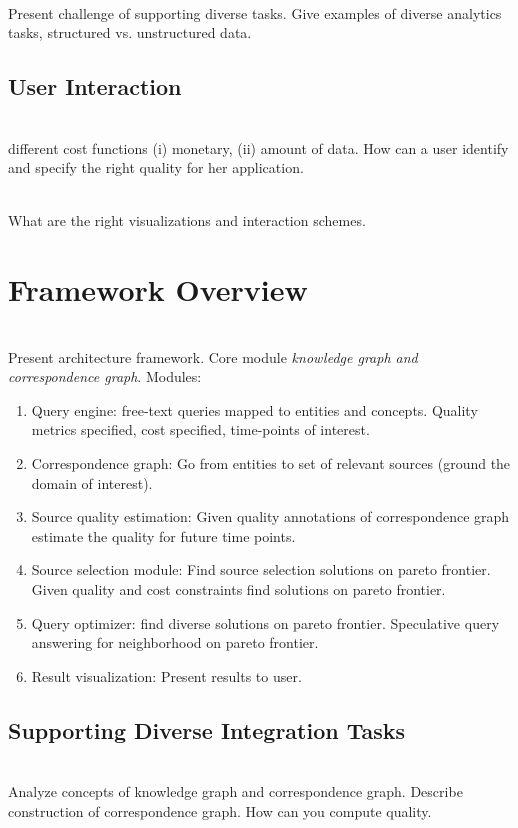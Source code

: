 \documentclass{sig-alternate}
\begin{document}
\ \\Present challenge of supporting diverse tasks. Give examples of diverse analytics tasks, structured vs. unstructured data. 

\subsection{User Interaction}
\ \\different cost functions (i) monetary, (ii) amount of data. How can a user identify and specify the right quality for her application. 

\ \\What are the right visualizations and interaction schemes.

\section{Framework Overview}

\ \\Present architecture framework. Core module {\em knowledge graph and correspondence graph}. Modules:
\begin{enumerate}
\item Query engine: free-text queries mapped to entities and concepts. Quality metrics specified, cost specified, time-points of interest. 
\item Correspondence graph: Go from entities to set of relevant sources (ground the domain of interest). 
\item Source quality estimation: Given quality annotations of correspondence graph estimate the quality for future time points.
\item Source selection module: Find source selection solutions on pareto frontier. Given quality and cost constraints find solutions on pareto frontier. 
\item Query optimizer: find diverse solutions on pareto frontier. Speculative query answering for neighborhood on pareto frontier. 
\item Result visualization: Present results to user. 
\end{enumerate}

\subsection{Supporting Diverse Integration Tasks}

\ \\Analyze concepts of knowledge graph and correspondence graph. Describe construction of correspondence graph. How can you compute quality. 
\end{document}
